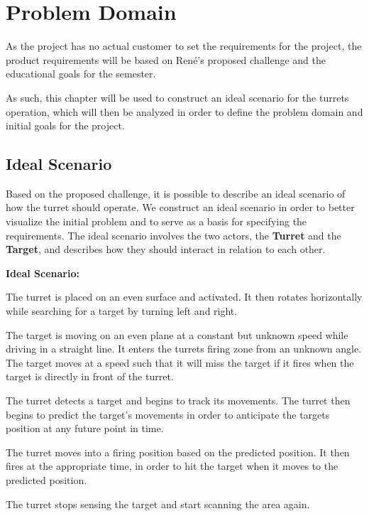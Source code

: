 \chapter{Problem Domain}\label{ProblemDomain}
As the project has no actual customer to set the requirements for the project,
the product requirements will be based on Ren\'e's proposed challenge and
the educational goals for the semester.\nl

As such, this chapter will be used to construct an ideal scenario for the
turrets operation, which will then be analyzed in order to define the problem
domain and initial goals for the project.

\section{Ideal Scenario}
Based on the proposed challenge, it is possible to describe an ideal scenario
of how the turret should operate. We construct an ideal scenario in order to better
visualize the initial problem and to serve as a basis for specifying the
requirements. The ideal scenario involves the two actors, the \textbf{Turret}
and the \textbf{Target}, and describes how they should interact in relation to
each other.

\begin{center}
\colorbox{diff}{
\begin{minipage}{0.8\linewidth}
\textbf{Ideal Scenario:}

The turret is placed on an even surface and activated. It then rotates
horizontally while searching for a target by turning left and right.\nl

The target is moving on an even plane at a constant but unknown speed while
driving in a straight line. It enters the turrets firing zone from an
unknown angle. The target moves at a speed such that it will miss the target if
it fires when the target is directly in front of the turret.\nl

The turret detects a target and begins to track its movements. The turret then
begins to predict the target's movements in order to anticipate the targets
position at any future point in time.\nl

The turret moves into a firing position based on the predicted position. It then
fires at the appropriate time, in order to hit the target when it moves to the
predicted position.\nl

The turret stops sensing the target and start scanning the area again.
\end{minipage}
}
\end{center}


